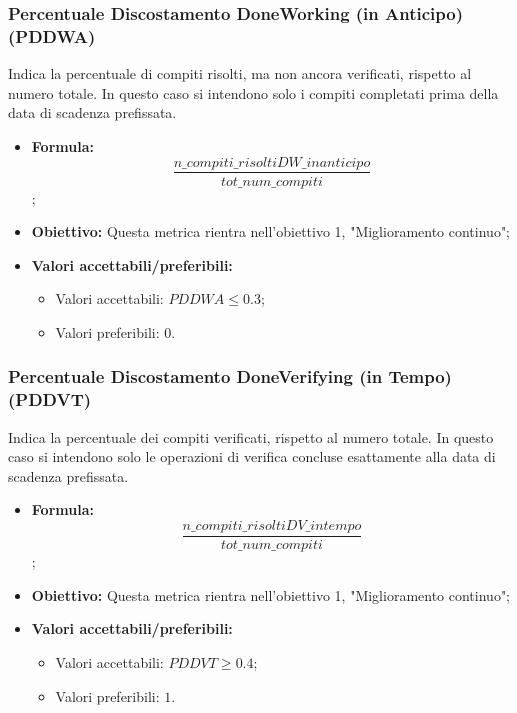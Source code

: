 \subsubsection{Percentuale Discostamento DoneWorking (in Anticipo) (PDDWA)}
Indica la percentuale di compiti risolti, ma non ancora verificati, rispetto al numero totale. In questo caso si intendono solo i compiti completati prima della data di scadenza prefissata.
\begin{itemize}
	\item \textbf{Formula:}\[\frac{n\_compiti\_risoltiDW\_inanticipo}{tot\_num\_compiti}\];
	\item \textbf{Obiettivo:} Questa metrica rientra nell'obiettivo 1, "Miglioramento continuo";
	\item \textbf{Valori accettabili/preferibili: }
	\begin{itemize}
		\item Valori accettabili: $PDDWA \leq 0.3$;
		\item Valori preferibili: $0$.
	\end{itemize}
\end{itemize}

\subsubsection{Percentuale Discostamento DoneVerifying (in Tempo) (PDDVT)}
Indica la percentuale dei compiti verificati, rispetto al numero totale. In questo caso si intendono solo le operazioni di verifica concluse esattamente alla data di scadenza prefissata.
\begin{itemize}
	\item \textbf{Formula:}\[\frac{n\_compiti\_risoltiDV\_intempo}{tot\_num\_compiti}\];
	\item \textbf{Obiettivo:} Questa metrica rientra nell'obiettivo 1, "Miglioramento continuo";
	\item \textbf{Valori accettabili/preferibili: }
	\begin{itemize}
		\item Valori accettabili: $PDDVT \geq 0.4$;
		\item Valori preferibili: $1$.
	\end{itemize}
\end{itemize}

